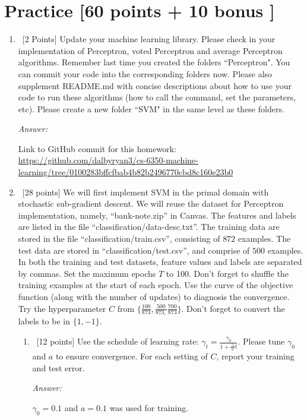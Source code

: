 \documentclass[12pt, fullpage,letterpaper]{article}
\begin{document}
\section{Practice [60 points + 10 bonus ]}
\begin{enumerate}
	\item~[2 Points] Update your machine learning library. Please check in your implementation of Perceptron, voted Perceptron and average Perceptron algorithms. Remember last time you created the folders ``Perceptron". You can commit your code into the corresponding folders now. Please also supplement README.md with concise descriptions about how to use your code to run these algorithms (how to call the command, set the parameters, etc). Please create a new folder ``SVM" in the same level as these folders.  

	\textit{Answer:}

	Link to GitHub commit for this homework: \url{https://github.com/dalbyryan3/cs-6350-machine-learning/tree/0100283bffcfbab4b82b2496770cbd8c160e23b0} 


	\item~[28 points] We will first implement SVM in the primal domain with stochastic sub-gradient descent. We will reuse the  dataset for Perceptron implementation, namely, ``bank-note.zip'' in Canvas. The features and labels are listed in the file ``classification/data-desc.txt''. The training data are stored in the file ``classification/train.csv'', consisting of $872$ examples. The test data are stored in ``classification/test.csv'', and comprise of $500$ examples. In both the training and test datasets, feature values and labels are separated by commas. Set the maximum epochs $T$ to 100. Don't forget to shuffle the training examples at the start of each epoch. Use the curve of the objective function (along with the number of updates) to diagnosis the convergence. Try the hyperparameter $C$ from $\{ \frac{100}{873}, \frac{500}{873,} \frac{700}{873}\}$. Don't forget to convert the labels to be in $\{1, -1\}$.  
	\begin{enumerate}
		\item~[12 points] Use the schedule of learning rate: $\gamma_t = \frac{\gamma_0}{1+\frac{\gamma_0}{a}t}	$. Please tune $\gamma_0$ and $a$ to ensure convergence. For each setting of $C$, report your training and test error. 

		\textit{Answer:}

		$\gamma_0 = 0.1$ and $a = 0.1$ was used for training.


\end{enumerate}
\end{enumerate}
\end{document}
